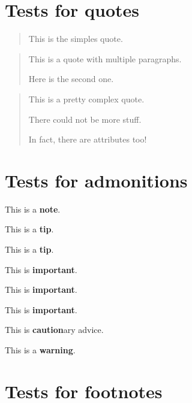 \documentclass{Metanorma}
\begin{document}
  \section{Tests for quotes}

  \begin{quote}
    This is the simples quote.
  \end{quote}

  \begin{quote}
    This is a quote with multiple paragraphs.

    Here is the second one.
  \end{quote}

  \begin{quote}
    This is a pretty complex quote.

    There could not be more stuff.

    In fact, there are attributes too!
  \end{quote}

  \section{Tests for admonitions}

  \begin{note}
    This is a \textbf{note}.
  \end{note}

  \begin{tip}
    This is a \textbf{tip}.

    This is a \textbf{tip}.
  \end{tip}

  \begin{important}
    This is \textbf{important}.

    This is \textbf{important}.

    This is \textbf{important}.
  \end{important}

  \begin{caution}
    This is \textbf{caution}ary advice.
  \end{caution}

  \begin{warning}
    This is a \textbf{warning}.
  \end{warning}

  \section{Tests for footnotes}
\end{document}
